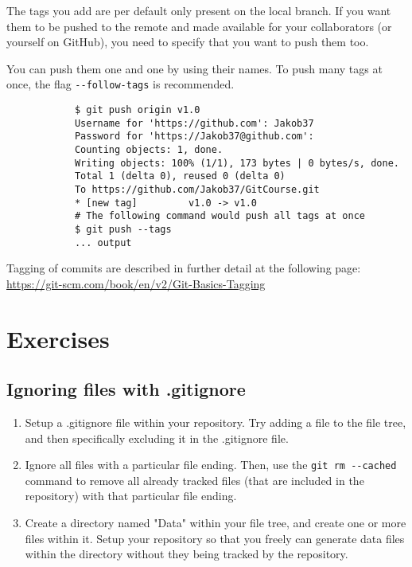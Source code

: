 \documentclass[../main/git_course_main.tex]{subfiles}
\begin{document}
	The tags you add are per default only present on the local branch. If you want them to be
	pushed to the remote and made available for your collaborators (or yourself on GitHub), you need to specify that you want to push them too.
	
	You can push them one and one by using their names. To push many tags at once, the flag \verb$--follow-tags$ is recommended.
	
	\begin{codebox}
		\begin{lstlisting}
			$ git push origin v1.0
			Username for 'https://github.com': Jakob37
			Password for 'https://Jakob37@github.com': 
			Counting objects: 1, done.
			Writing objects: 100% (1/1), 173 bytes | 0 bytes/s, done.
			Total 1 (delta 0), reused 0 (delta 0)
			To https://github.com/Jakob37/GitCourse.git
			* [new tag]         v1.0 -> v1.0
			# The following command would push all tags at once
			$ git push --tags
			... output
		\end{lstlisting}
	\end{codebox}
	
	Tagging of commits are described in further detail at the following page: \\
	
	\url{https://git-scm.com/book/en/v2/Git-Basics-Tagging} \\
	
	
	
	\newpage
	\section{Exercises}
	
	\subsection{Ignoring files with .gitignore}
	
	\begin{enumerate}
		\item Setup a .gitignore file within your repository. Try adding a file to the file tree, and then specifically excluding it in the .gitignore file.
		\item Ignore all files with a particular file ending. Then, use the \verb$git rm --cached$ command to remove all already tracked files (that are included in the repository) with that particular file ending.
		\item Create a directory named "Data" within your file tree, and create one or more files within it. Setup your repository so that you freely can generate data files within the directory without they being tracked by the repository.
	\end{enumerate}
	
\end{document}
